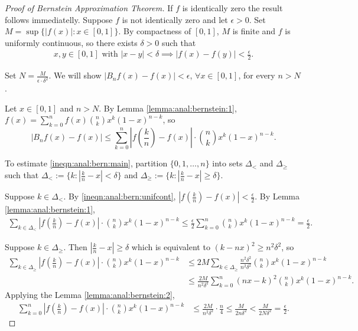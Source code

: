 \begin{proof}[Proof of Bernstein Approximation Theorem]
If $f$ is identically zero the result follows immediatelly.
Suppose $f$ is not identically zero and let $\epsilon > 0$. Set $M = \sup \{|f(x)| : x \in [0,1] \}$. By compactness of $[0,1]$, $M$ is finite and $f$ is uniformly continuous, so there exists $\delta > 0$ such that \begin{align}
    \label{ineqn:anal:bern:unifcont}
    x,y \in [0,1] \text{ with } | x - y | < \delta \implies | f(x) - f (y) | < \frac{\epsilon}{2}.
\end{align}

Set $N = \frac{M}{\epsilon \cdot \delta^2}$. We will show $|  B_n{f}(x) - f(x) | < \epsilon$, $\forall x \in [0, 1]$, for every $n > N$.

Let $x \in [0,1]$ and $n > N$. By Lemma \ref{lemma:anal:bernstein:1}, $f(x) = \sum_{k = 0}^n f(x) \binom{n}{k} x^k (1 - x)^{n - k}$,
so \begin{equation}
    \label{ineqn:anal:bern:main}
    |  B_n{f}(x) - f(x) | \leq \sum_{k = 0}^n \left | f \left(\frac{k}{n}\right) - f(x) \right | \cdot  \binom{n}{k} x^k (1 - x)^{n - k}.
\end{equation}

To estimate \ref{ineqn:anal:bern:main}, partition $\{ 0, 1, \ldots, n \}$ into sets $\Delta_{<}$ and $\Delta_{\geq}$ such that $\Delta_{<} := \{ k : \left | \frac{k}{n} - x \right | < \delta \}$ and $\Delta_{\geq} := \{ k : \left | \frac{k}{n} - x \right | \geq \delta \}$.

Suppose $k \in \Delta_<$. By \ref{ineqn:anal:bern:unifcont}, $\left | f \left(\frac{k}{n} \right) - f(x) \right | < \frac{\epsilon}{2}$. By Lemma \ref{lemma:anal:bernstein:1},
\begin{align}
    \label{ineqn:anal:bern:delta_less}
    \sum_{k \in \Delta_<}  \left | f \left(\frac{k}{n}\right) - f(x) \right | \cdot  \binom{n}{k} x^k (1 - x)^{n - k} \leq \frac{\epsilon}{2} \sum_{k = 0}^n  \binom{n}{k} x^k (1 - x)^{n - k} = \frac{\epsilon}{2}.
\end{align}

Suppose $k \in \Delta_\geq$. Then $\left | \frac{k}{n} - x \right | \geq \delta$ which is equivalent to $(k - nx)^2 \geq n^2 \delta^2$, so
\begin{align*}
    \sum_{k \in \Delta_\geq}  \left | f \left(\frac{k}{n}\right) - f(x) \right | \cdot  \binom{n}{k} x^k (1 - x)^{n - k} &\leq 2M \sum_{k \in \Delta_\geq} \frac{n^2 \delta^2}{n^2 \delta^2} \binom{n}{k} x^k (1 - x)^{n - k} & \\
    &\leq \frac{2M}{n^2 \delta^2} \sum_{k = 0}^n (nx - k)^2 \binom{n}{k} x^k (1 - x)^{n - k}
    .
\end{align*}
Applying the Lemma \ref{lemma:anal:bernstein:2},
\begin{align}
    \label{ineqn:anal:bern:delta_geq}
    \sum_{k = 0}^n  \left | f \left(\frac{k}{n}\right) - f(x) \right | \cdot  \binom{n}{k} x^k (1 - x)^{n - k} &\leq \frac{2M}{n^2 \delta^2} \cdot \frac{n}{4} \leq \frac{M}{2n\delta^2} < \frac{M}{2N \delta ^2} = \frac{\epsilon}{2}.
\end{align}


\end{proof}

